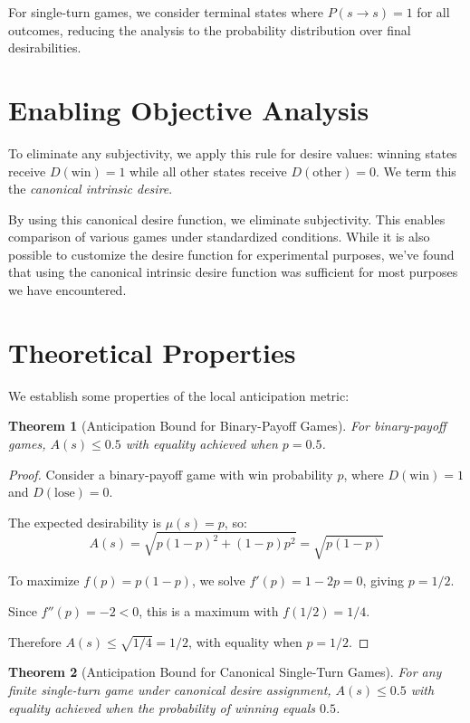 \documentclass[manuscript,review,anonymous]{acmart}
\theoremstyle{definition}
\theoremstyle{plain}
\newtheorem{theorem}{Theorem}
\begin{document}
For single-turn games, we consider terminal states where $P(s \to s) = 1$ for all outcomes, reducing the analysis to the probability distribution over final desirabilities.

\section{Enabling Objective Analysis}
To eliminate any subjectivity, we apply this rule for desire values: winning states receive $D(\text{win}) = 1$ while all other states receive $D(\text{other}) = 0$.
We term this the \emph{canonical intrinsic desire}.

By using this canonical desire function, we eliminate subjectivity.
This enables comparison of various games under standardized conditions.
While it is also possible to customize the desire function for experimental purposes, we've found that using the canonical intrinsic desire function was sufficient for most purposes we have encountered.

\section{Theoretical Properties}
We establish some properties of the local anticipation metric:

\begin{theorem}[Anticipation Bound for Binary-Payoff Games]\label{thm:anticipation_bound_binary_payoff}
  For binary-payoff games, $A(s) \leq 0.5$ with equality achieved when $p = 0.5$.
\end{theorem}

\begin{proof}
  Consider a binary-payoff game with win probability $p$, where $D(\text{win}) = 1$ and $D(\text{lose}) = 0$.

  The expected desirability is $\mu(s) = p$, so:
  \[
    A(s) = \sqrt{p(1-p)^2 + (1-p)p^2} = \sqrt{p(1-p)}
  \]

  To maximize $f(p) = p(1-p)$, we solve $f'(p) = 1-2p = 0$, giving $p = 1/2$.

  Since $f''(p) = -2 < 0$, this is a maximum with $f(1/2) = 1/4$.

  Therefore $A(s) \leq \sqrt{1/4} = 1/2$, with equality when $p = 1/2$.
\end{proof}

\begin{theorem}[Anticipation Bound for Canonical Single-Turn Games]\label{thm:anticipation_bound_canonical_single_turn}
  For any finite single-turn game under canonical desire assignment, $A(s) \leq 0.5$ with equality achieved when the probability of winning equals $0.5$.
\end{theorem}
\end{document}
